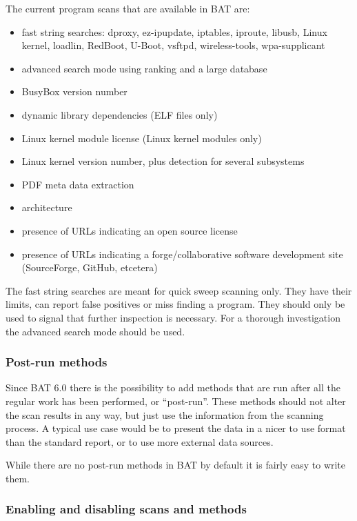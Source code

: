 \documentclass[10pt]{article}
\begin{document}
The current program scans that are available in BAT are:

\begin{itemize}
\item fast string searches: dproxy, ez-ipupdate, iptables, iproute, libusb,
Linux kernel, loadlin, RedBoot, U-Boot, vsftpd, wireless-tools, wpa-supplicant
\item advanced search mode using ranking and a large database
\item BusyBox version number
\item dynamic library dependencies (ELF files only)
\item Linux kernel module license (Linux kernel modules only)
\item Linux kernel version number, plus detection for several subsystems
\item PDF meta data extraction
\item architecture
\item presence of URLs indicating an open source license
\item presence of URLs indicating a forge/collaborative software development site (SourceForge, GitHub, etcetera)
\end{itemize}

The fast string searches are meant for quick sweep scanning only. They have
their limits, can report false positives or miss finding a program. They should
only be used to signal that further inspection is necessary. For a thorough
investigation the advanced search mode should be used.

\subsubsection{Post-run methods}

Since BAT 6.0 there is the possibility to add methods that are run after all
the regular work has been performed, or ``post-run''. These methods should not
alter the scan results in any way, but just use the information from the
scanning process. A typical use case would be to present the data in a nicer
to use format than the standard report, or to use more external data sources.

While there are no post-run methods in BAT by default it is fairly easy to
write them.

\subsubsection{Enabling and disabling scans and methods}
\end{document}
